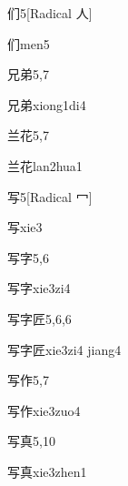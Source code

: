 \begin{entry}{们}{5}[Radical 人]
  \begin{phonetics}{们}{men5}
  \end{phonetics}
\end{entry}

\begin{entry}{兄弟}{5,7}
  \begin{phonetics}{兄弟}{xiong1di4}
  \end{phonetics}
\end{entry}

\begin{entry}{兰花}{5,7}
  \begin{phonetics}{兰花}{lan2hua1}
  \end{phonetics}
\end{entry}

\begin{entry}{写}{5}[Radical 冖]
  \begin{phonetics}{写}{xie3}
  \end{phonetics}
\end{entry}

\begin{entry}{写字}{5,6}
  \begin{phonetics}{写字}{xie3zi4}
  \end{phonetics}
\end{entry}

\begin{entry}{写字匠}{5,6,6}
  \begin{phonetics}{写字匠}{xie3zi4 jiang4}
  \end{phonetics}
\end{entry}

\begin{entry}{写作}{5,7}
  \begin{phonetics}{写作}{xie3zuo4}
  \end{phonetics}
\end{entry}

\begin{entry}{写真}{5,10}
  \begin{phonetics}{写真}{xie3zhen1}
  \end{phonetics}
\end{entry}

